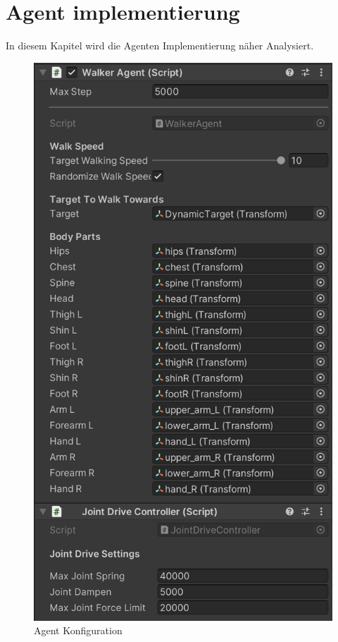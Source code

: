 \section{Agent implementierung}
In diesem Kapitel wird die Agenten Implementierung näher Analysiert.
\begin{figure}[H]
  \centering  
  \includegraphics[scale=0.5]{img/agent_konfiguration.png}
  \caption{Agent Konfiguration}
  \label{fig:agent_konfiguration}
\end{figure}

